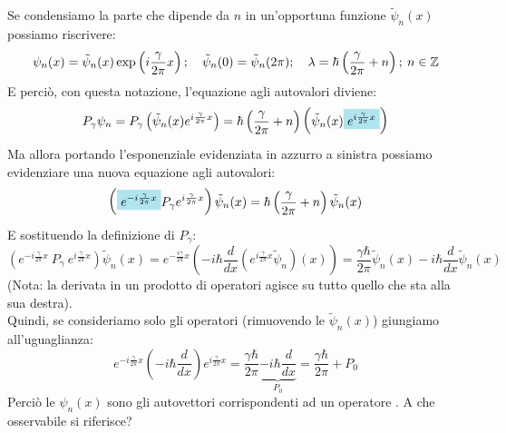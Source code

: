 \documentclass[../../FisicaTeorica.tex]{subfiles}
\begin{document}
Se condensiamo la parte che dipende da $n$ in un'opportuna funzione $\tilde{\psi}_n(x)$ possiamo riscrivere:
\[
\psi_n(x) = \tilde{\psi}_n(x) \exp\left(i\frac{\gamma}{2\pi}x\right); \quad \tilde{\psi}_n(0) = \tilde{\psi}_n(2\pi); \quad \lambda = \hbar \left(\frac{\gamma}{2\pi} + n\right); \> n\in \mathbb{Z}
\]
E perciò, con questa notazione, l'equazione agli autovalori diviene:
\[
P_\gamma \psi_n = P_\gamma\left(\tilde{\psi}_n(x) e^{i\frac{\gamma}{2\pi}x}\right) = \hbar \left(\frac{\gamma}{2\pi}+n\right)\left(\tilde{\psi}_n(x) \hlc{SkyBlue}{e^{i\frac{\gamma}{2\pi}x}}\right )
\]
Ma allora portando l'esponenziale evidenziata in azzurro a sinistra possiamo evidenziare una nuova equazione agli autovalori:
\[
\left( \hlc{SkyBlue}{e^{-i\frac{\gamma}{2\pi}x}}P_\gamma e^{i\frac{\gamma}{2\pi}x}\right )\tilde{\psi}_n(x) = \hbar \left(\frac{\gamma}{2\pi}+n\right)\tilde{\psi}_n(x)
\]
E sostituendo la definizione di $P_\gamma$:
\[
\left(e^{-i\frac{\gamma}{2\pi}x}\ P_\gamma\ e^{i\frac{\gamma}{2\pi}x}\right){\widetilde{\psi}}_n\left(x\right)=
e^{-\frac{i\gamma}{2\pi}x}\left(-i\hbar\frac{d}{dx}\left(e^{i\frac{\gamma}{2\pi}x}\tilde{\psi}_n\right)\left(x\right)\right)=\frac{\gamma\hbar}{2\pi}\tilde{\psi}_n
\left(x\right)-i\hbar \frac{d}{dx}\tilde{\psi}_n(x)
\]
(Nota: la derivata in un prodotto di operatori agisce su tutto quello che sta alla sua destra).\\
Quindi, se consideriamo solo gli operatori (rimuovendo le $\tilde{\psi}_n(x)$) giungiamo all'uguaglianza:
\[
e^{-i\frac{\gamma}{2\pi}x}\left(-i\hbar\frac{d}{dx}\right)e^{i\frac{\gamma}{2\pi}x}=\frac{\gamma\hbar}{2\pi}\underbrace{-i\hbar \frac{d}{dx}}_{P_0} = \frac{\gamma \hbar}{2\pi} + P_0
\]
Perciò le $\psi_n(x)$ sono gli autovettori corrispondenti ad un operatore . A che osservabile si riferisce?\\
\end{document}
